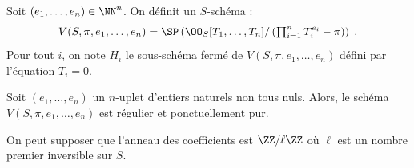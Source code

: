 \documentclass[10pt]{../fichiers-configuration-latex/smfart}
\begin{document}
\bigskip

\begin{definition2}\label{16-definition-schemas-v}
Soit $(e_1,\dots,e_n)\in\NN^n$.
On définit un $S$-schéma :
\[V(S,\pi,e_1,\dots,e_n)=
\SP\left(\OO_S[T_1,\dots,T_n]/
\left(\textstyle\prod_{i=1}^n T_i^{e_i}-\pi\right)\right)\;\text{.}\]
Pour tout $i$, on note $H_i$ le sous-schéma fermé de
$V(S,\pi,e_1,\dots,e_n)$ défini par l'équation $T_i=0$.
\end{definition2}

\begin{proposition2}\label{16-proposition-standards-reguliers}
Soit $(e_1,\dots,e_n)$ un $n$-uplet d'entiers naturels non tous nuls.
Alors,
le schéma $V(S,\pi,e_1,\dots,e_n)$ est régulier et ponctuellement pur.
\end{proposition2}

On peut supposer que l'anneau des coefficients est $\ZZ/\ell\ZZ$ où $\ell$
est un nombre premier inversible sur $S$.
\end{document}

